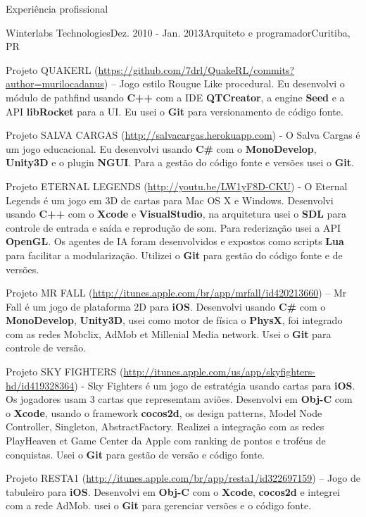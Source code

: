 \documentclass{resume}
\begin{document}
\begin{rSection}{Experiência profissional}
\begin{rSubsection}{Winterlabs Technologies}{Dez. 2010 - Jan. 2013}{Arquiteto e programador}{Curitiba, PR}
    \item Projeto QUAKERL (\url{https://github.com/7drl/QuakeRL/commits?author=murilocadanus}) – Jogo estilo Rougue Like procedural. Eu desenvolvi o módulo de pathfind usando \textbf{C++} com a IDE \textbf{QTCreator}, a engine \textbf{Seed} e a API \textbf{libRocket} para a UI.  Eu usei o \textbf{Git} para versionamento de código fonte. \\
    \item Projeto SALVA CARGAS (\url{http://salvacargas.herokuapp.com}) - O Salva Cargas é um jogo educacional. Eu desenvolvi usando \textbf{C\#} com o \textbf{MonoDevelop}, \textbf{Unity3D} e o plugin \textbf{NGUI}. Para a gestão do código fonte e versões usei o \textbf{Git}. \\
    \item Projeto ETERNAL LEGENDS (\url{http://youtu.be/LW1yF8D-CKU}) - O Eternal Legends é um jogo em 3D de cartas para Mac OS X e Windows. Desenvolvi usando \textbf{C++} com o \textbf{Xcode} e \textbf{VisualStudio}, na arquitetura usei o \textbf{SDL} para controle de entrada e saída e reprodução de som. Para rederização usei a API \textbf{OpenGL}. Os agentes de IA foram desenvolvidos e expostos como scripts \textbf{Lua} para facilitar a modularização. Utilizei o \textbf{Git} para gestão do código fonte e de versões. \\
    \item Projeto MR FALL (\url{http://itunes.apple.com/br/app/mrfall/id420213660}) – Mr Fall é um jogo de plataforma 2D para \textbf{iOS}. Desenvolvi usando \textbf{C\#} com o \textbf{MonoDevelop}, \textbf{Unity3D}, usei como motor de física o \textbf{PhysX}, foi integrado com as redes Mobclix, AdMob et Millenial Media network. Usei o \textbf{Git} para controle de versão. \\
    \item Projeto SKY FIGHTERS (\url{http://itunes.apple.com/us/app/skyfighters-hd/id419328364}) - Sky Fighters é um jogo de estratégia usando cartas para \textbf{iOS}. Os jogadores usam 3 cartas que represemtam aviões. Desenvolvi em \textbf{Obj-C} com o \textbf{Xcode}, usando o framework \textbf{cocos2d}, os design patterns, Model Node Controller, Singleton, AbstractFactory. Realizei a integração com as redes PlayHeaven et Game Center da Apple com ranking de pontos e troféus de conquistas. Usei o \textbf{Git} para gestão de versão e código fonte. \\
    \item Projeto RESTA1 (\url{http://itunes.apple.com/br/app/resta1/id322697159}) – Jogo de tabuleiro para \textbf{iOS}. Desenvolvi em \textbf{Obj-C} com o \textbf{Xcode}, \textbf{cocos2d} e integrei com a rede AdMob. usei o \textbf{Git} para gerenciar versões e o código fonte.

\end{rSubsection}
\end{rSection}
\end{document}
